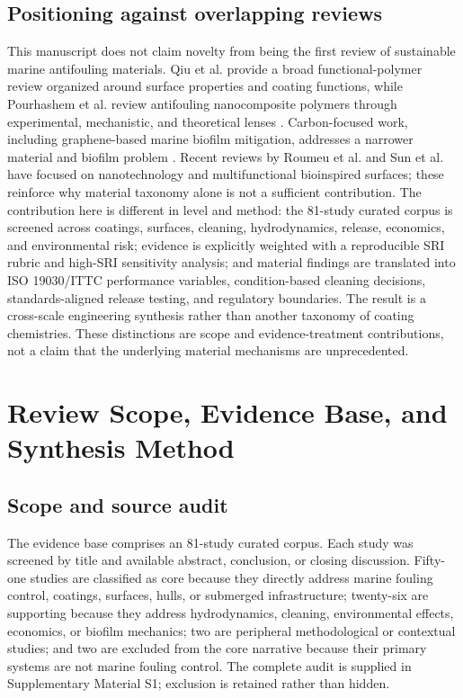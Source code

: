 \subsection{Positioning against overlapping reviews}
This manuscript does not claim novelty from being the first review of sustainable marine antifouling materials. Qiu et al. provide a broad functional-polymer review organized around surface properties and coating functions, while Pourhashem et al. review antifouling nanocomposite polymers through experimental, mechanistic, and theoretical lenses \cite{qiu2022functional,pourhashem2022nanocomposite}. Carbon-focused work, including graphene-based marine biofilm mitigation, addresses a narrower material and biofilm problem \cite{sousacardoso2023graphene}. Recent reviews by Roumeu et al. and Sun et al. have focused on nanotechnology and multifunctional bioinspired surfaces; these reinforce why material taxonomy alone is not a sufficient contribution. The contribution here is different in level and method: the 81-study curated corpus is screened across coatings, surfaces, cleaning, hydrodynamics, release, economics, and environmental risk; evidence is explicitly weighted with a reproducible SRI rubric and high-SRI sensitivity analysis; and material findings are translated into ISO 19030/ITTC performance variables, condition-based cleaning decisions, standards-aligned release testing, and regulatory boundaries. The result is a cross-scale engineering synthesis rather than another taxonomy of coating chemistries. These distinctions are scope and evidence-treatment contributions, not a claim that the underlying material mechanisms are unprecedented.

\section{Review Scope, Evidence Base, and Synthesis Method}
\subsection{Scope and source audit}
\label{sec:scope-audit}
The evidence base comprises an 81-study curated corpus. Each study was screened by title and available abstract, conclusion, or closing discussion. Fifty-one studies are classified as core because they directly address marine fouling control, coatings, surfaces, hulls, or submerged infrastructure; twenty-six are supporting because they address hydrodynamics, cleaning, environmental effects, economics, or biofilm mechanics; two are peripheral methodological or contextual studies; and two are excluded from the core narrative because their primary systems are not marine fouling control. The complete audit is supplied in Supplementary Material S1; exclusion is retained rather than hidden.

